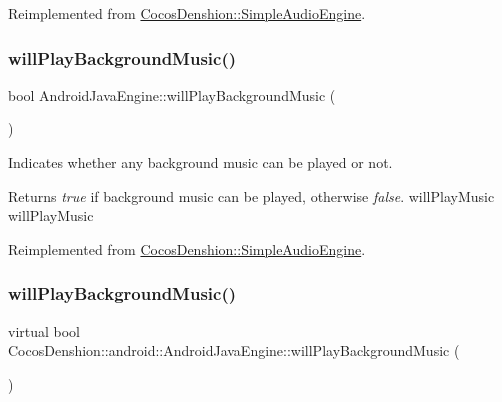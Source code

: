 Reimplemented from \hyperlink{classCocosDenshion_1_1SimpleAudioEngine_ad370e42405e90a0701fe9ee63d29c8e1}{Cocos\+Denshion\+::\+Simple\+Audio\+Engine}.

\mbox{\label{classCocosDenshion_1_1android_1_1AndroidJavaEngine_aa6301c0260249ef37088872b3710adeb}} 
\subsubsection{\texorpdfstring{will\+Play\+Background\+Music()}{willPlayBackgroundMusic()}\hspace{0.1cm}{\footnotesize\ttfamily [1/2]}}
{\footnotesize\ttfamily bool Android\+Java\+Engine\+::will\+Play\+Background\+Music (\begin{DoxyParamCaption}{ }\end{DoxyParamCaption})\hspace{0.3cm}{\ttfamily [virtual]}}

Indicates whether any background music can be played or not.

\begin{DoxyReturn}{Returns}
{\itshape true} if background music can be played, otherwise {\itshape false}.  will\+Play\+Music  will\+Play\+Music 
\end{DoxyReturn}


Reimplemented from \hyperlink{classCocosDenshion_1_1SimpleAudioEngine_af2a5eb0c4a7127c62a0c61dfd285d076}{Cocos\+Denshion\+::\+Simple\+Audio\+Engine}.

\mbox{\label{classCocosDenshion_1_1android_1_1AndroidJavaEngine_a3d3d6f0913b802f34598d4a89023a21f}} 
\subsubsection{\texorpdfstring{will\+Play\+Background\+Music()}{willPlayBackgroundMusic()}\hspace{0.1cm}{\footnotesize\ttfamily [2/2]}}
{\footnotesize\ttfamily virtual bool Cocos\+Denshion\+::android\+::\+Android\+Java\+Engine\+::will\+Play\+Background\+Music (\begin{DoxyParamCaption}{ }\end{DoxyParamCaption})\hspace{0.3cm}{\ttfamily [virtual]}}

